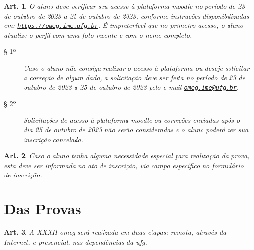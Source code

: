\documentclass[a4paper,12pt]{article}
\makeatletter
\newtheorem{article}{Art.}
\def\url{https://omeg.ime.ufg.br}
\def\homepage{\href{\url}{\texttt{\url}}}
\def\emailaddres{omeg.ime@ufg.br}
\def\contactUs{\href{mailto:\emailaddres}{\texttt{\emailaddres}}}
\def\currentEdition{XXXII}
\def\year{2023}
\def\testingAccessToThePlatformOpeningDate{23 de outubro de \year}
\def\testingAccessToThePlatformClosingDate{25 de outubro de \year}
\def\fixAccessCredentialsOpeningDate{23 de outubro de \year}
\def\fixAccessCredentialsClosingDate{25 de outubro de \year}
\makeatother
\begin{document}
\begin{article}
  O aluno deve verificar seu acesso à plataforma \acrshort{moodle} no período
  de \testingAccessToThePlatformOpeningDate{} a
  \testingAccessToThePlatformClosingDate, conforme instruções disponibilizadas
  em: \homepage. É impreterível que no primeiro acesso, o aluno atualize o
  perfil com uma foto recente e com o nome completo.
  \begin{description}
    \item[§ 1º]
      Caso o aluno não consiga realizar o acesso à plataforma ou deseje
      solicitar a correção de algum dado, a solicitação deve ser feita no
      período de \fixAccessCredentialsOpeningDate{} a
      \fixAccessCredentialsClosingDate{} pelo e-mail \contactUs.
    \item[§ 2º]
      Solicitações de acesso à plataforma \acrshort{moodle} ou correções
      enviadas após o dia \fixAccessCredentialsClosingDate{} não serão
      consideradas e o aluno poderá ter sua inscrição cancelada.
  \end{description}
\end{article}

\begin{article}
  Caso o aluno tenha alguma necessidade especial para realização da prova,
  esta deve ser informada no ato de inscrição, via campo específico no
  formulário de inscrição.
\end{article}

\section*{Das Provas}

\begin{article}
  A \currentEdition{} \acrshort{omeg} será realizada em duas etapas: remota,
  através da Internet, e presencial, nas dependências da \acrshort{ufg}.
\end{article}
\end{document}
